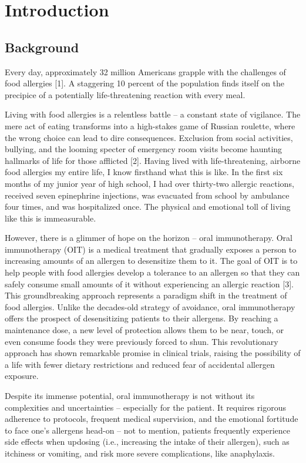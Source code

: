 \chapter{Introduction}

\section{Background}

Every day, approximately 32 million Americans grapple with the challenges of food allergies [1]. A staggering 10 percent of the population finds itself on the precipice of a potentially life-threatening reaction with every meal. \par
Living with food allergies is a relentless battle – a constant state of vigilance. The mere act of eating transforms into a high-stakes game of Russian roulette, where the wrong choice can lead to dire consequences. Exclusion from social activities, bullying, and the looming specter of emergency room visits become haunting hallmarks of life for those afflicted [2]. Having lived with life-threatening, airborne food allergies my entire life, I know firsthand what this is like. In the first six months of my junior year of high school, I had over thirty-two allergic reactions, received seven epinephrine injections, was evacuated from school by ambulance four times, and was hospitalized once. The physical and emotional toll of living like this is immeasurable.\par
However, there is a glimmer of hope on the horizon – oral immunotherapy. Oral immunotherapy (OIT) is a medical treatment that gradually exposes a person to increasing amounts of an allergen to desensitize them to it. The goal of OIT is to help people with food allergies develop a tolerance to an allergen so that they can safely consume small amounts of it without experiencing an allergic reaction [3]. This groundbreaking approach represents a paradigm shift in the treatment of food allergies. Unlike the decades-old strategy of avoidance, oral immunotherapy offers the prospect of desensitizing patients to their allergens. By reaching a maintenance dose, a new level of protection allows them to be near, touch, or even consume foods they were previously forced to shun. This revolutionary approach has shown remarkable promise in clinical trials, raising the possibility of a life with fewer dietary restrictions and reduced fear of accidental allergen exposure.\par
Despite its immense potential, oral immunotherapy is not without its complexities and uncertainties – especially for the patient. It requires rigorous adherence to protocols, frequent medical supervision, and the emotional fortitude to face one's allergens head-on – not to mention, patients frequently experience side effects when updosing (i.e., increasing the intake of their allergen), such as itchiness or vomiting, and risk more severe complications, like anaphylaxis.\par
